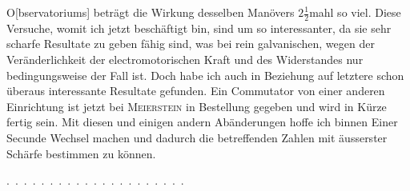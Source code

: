 O[bservatoriums] beträgt die Wirkung desselben Manövers \(2\frac{1}{2}\)mahl so viel.
Diese Versuche, womit ich jetzt beschäftigt bin, sind um so interessanter, da
sie sehr scharfe Resultate zu geben fähig sind, was bei rein galvanischen,
wegen der Veränderlichkeit der electromotorischen Kraft und des Widerstandes
nur bedingungsweise der Fall ist. Doch habe ich auch in Beziehung auf
letztere schon überaus interessante Resultate gefunden. Ein Commutator von
einer anderen Einrichtung ist jetzt bei \textsc{Meierstein} in Bestellung gegeben und
wird in Kürze fertig sein. Mit diesen und einigen andern Abänderungen
hoffe ich binnen Einer Secunde  Wechsel machen und
dadurch die betreffenden Zahlen mit äusserster Schärfe bestimmen zu können.
\par\noindent .\ .\ .\ .\ .\ .\ .\ .\ .\ .\ .\ .\ .\ .\ .\ .\ .\ .\ .\ .\ .
\clearpage\endgroup
